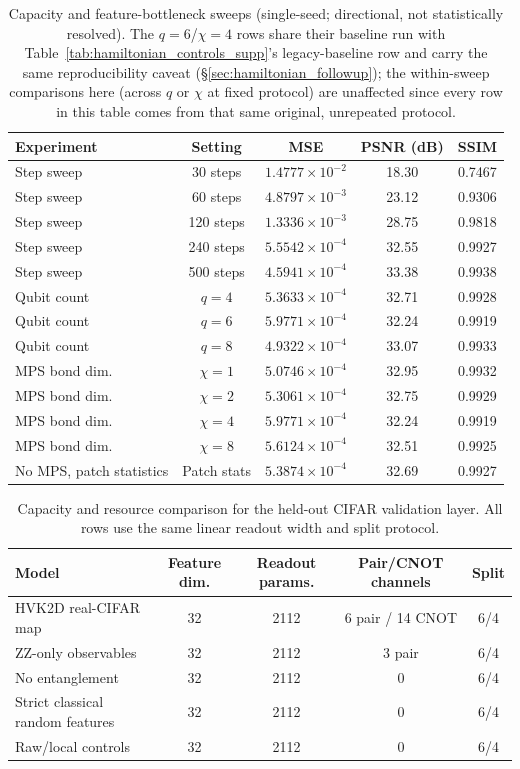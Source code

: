 \documentclass[11pt]{article}
\begin{document}
\begin{table}[H]
\centering
\caption{Capacity and feature-bottleneck sweeps (single-seed; directional, not statistically resolved). The $q=6$/$\chi=4$ rows share their baseline run with Table~\ref{tab:hamiltonian_controls_supp}'s legacy-baseline row and carry the same reproducibility caveat (\S\ref{sec:hamiltonian_followup}); the within-sweep comparisons here (across $q$ or $\chi$ at fixed protocol) are unaffected since every row in this table comes from that same original, unrepeated protocol.}
\label{tab:capacity_ablation}
\scriptsize
\begin{tabular}{lcccc}
\toprule
Experiment & Setting & MSE & PSNR (dB) & SSIM \\
\midrule
Step sweep & 30 steps & $1.4777\times10^{-2}$ & 18.30 & 0.7467 \\
Step sweep & 60 steps & $4.8797\times10^{-3}$ & 23.12 & 0.9306 \\
Step sweep & 120 steps & $1.3336\times10^{-3}$ & 28.75 & 0.9818 \\
Step sweep & 240 steps & $5.5542\times10^{-4}$ & 32.55 & 0.9927 \\
Step sweep & 500 steps & $4.5941\times10^{-4}$ & 33.38 & 0.9938 \\
Qubit count & $q=4$ & $5.3633\times10^{-4}$ & 32.71 & 0.9928 \\
Qubit count & $q=6$ & $5.9771\times10^{-4}$ & 32.24 & 0.9919 \\
Qubit count & $q=8$ & $4.9322\times10^{-4}$ & 33.07 & 0.9933 \\
MPS bond dim. & $\chi=1$ & $5.0746\times10^{-4}$ & 32.95 & 0.9932 \\
MPS bond dim. & $\chi=2$ & $5.3061\times10^{-4}$ & 32.75 & 0.9929 \\
MPS bond dim. & $\chi=4$ & $5.9771\times10^{-4}$ & 32.24 & 0.9919 \\
MPS bond dim. & $\chi=8$ & $5.6124\times10^{-4}$ & 32.51 & 0.9925 \\
No MPS, patch statistics & Patch stats & $5.3874\times10^{-4}$ & 32.69 & 0.9927 \\
\bottomrule
\end{tabular}
\end{table}

\begin{table}[H]
\centering
\caption{Capacity and resource comparison for the held-out CIFAR validation layer. All rows use the same linear readout width and split protocol.}
\label{tab:resource_capacity}
\scriptsize
\begin{tabular}{lcccc}
\toprule
Model & Feature dim. & Readout params. & Pair/CNOT channels & Split \\
\midrule
HVK2D real-CIFAR map & 32 & 2112 & 6 pair / 14 CNOT & 6/4 \\
ZZ-only observables & 32 & 2112 & 3 pair & 6/4 \\
No entanglement & 32 & 2112 & 0 & 6/4 \\
Strict classical random features & 32 & 2112 & 0 & 6/4 \\
Raw/local controls & 32 & 2112 & 0 & 6/4 \\
\bottomrule
\end{tabular}
\end{table}
\end{document}
